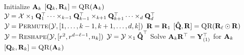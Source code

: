 
\begin{algorithmic}[1]
        \State Initialize $\mathbf{A}_k$
        \State $[\mat{Q}_k,\mat{R}_k] = \Call{QR}{\mat{A}_k}$  \label{l:pair-factor-QR}
      \EndFor
          \State $\T{Y} =  \T{X} \times_1 \mat{Q}_1^\top \dots \times_{k-1} \mat{Q}_{k-1}^\top \times_{k+1} \mat{Q}_{k+1}^\top \dots \times_d \mat{Q}_d^\top$   \label{l:pairwise-TTM}
          \State $\T{Y} = \Call{Permute}{\T{Y},[1,\dots,k-1,k+1,\dots,d,k]}$  \label{l:pairwise-permute}
          \State $\mathbf{R} = \mathbf{R}_1$
            \State $[\M[\hat]{Q},\mat{R}] = \Call{QR}{\mat{R}_\ell \odot \mat{R}}$  \label{l:pairwise-QR}
            \State $\T{Y}= \Call{Reshape}{\T{Y},[r^2,r^{d-\ell-1},n_k]}$ 
            \State $\T[]{Y} = \T[]{Y} \times_1 \M[\hat]{Q}^\top$  \label{l:pair-R-TTM} 
          \EndFor   
          \State Solve $  \mathbf{A}_k\mathbf{R}^\top = \mathbf{Y}_{(1)}^\top$ for $\mathbf{A}_k$  \label{l:pairwise-solve}
          \State $[\mat{Q}_k,\mat{R}_k] = \Call{QR}{\mat{A}_k}$   \label{l:pairwise-factorQR}
        \EndFor
      \EndWhile
    \EndFunction
  \end{algorithmic}